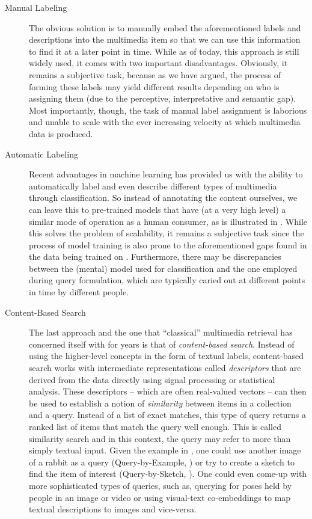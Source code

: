\begin{description}
    \item[Manual Labeling] The obvious solution is to manually embed the aforementioned labels and descriptions into the multimedia item so that we can use this information to find it at a later point in time. While as of today, this approach is still widely used, it comes with two important disadvantages. Obviously, it remains a subjective task, because as we have argued, the process of forming these labels may yield different results depending on who is assigning them (due to the perceptive, interpretative and semantic gap). Most importantly, though, the task of manual label assignment is laborious and unable to scale with the ever increasing velocity at which multimedia data is produced.
    \item[Automatic Labeling] Recent advantages in machine learning has provided us with the ability to automatically label and even describe different types of multimedia through classification. So instead of annotating the content ourselves, we can leave this to pre-trained models that have (at a very high level) a similar mode of operation as a human consumer, as is illustrated in . While this solves the problem of scalability, it remains a subjective task since the process of model training is also prone to the aforementioned gaps found in the data being trained on \cite{Baer2017:Controlling}. Furthermore, there may be discrepancies between the (mental) model used for classification and the one employed during query formulation, which are typically caried out at different points in time by different people.
    \item[Content-Based Search] The last approach and the one that ``classical'' multimedia retrieval has concerned itself with for years is that of \emph{content-based search}. Instead of using the higher-level concepts in the form of textual labels, content-based search works with intermediate representations called \emph{descriptors} that are derived from the data directly using signal processing or statistical analysis. These descriptors -- which are often real-valued vectors \cite{Zezula:2006Similarity} -- can then be used to establish a notion of \emph{similarity} between items in a collection and a query. Instead of a list of exact matches, this type of query returns a ranked list of items that match the query well enough. This is called similarity search \cite{Blanken:2007multimedia} and in this context, the query may refer to more than simply textual input. Given the example in , one could use another image of a rabbit as a query (Query-by-Example, \cite{Kelly:1995Query}) or try to create a sketch to find the item of interest (Query-by-Sketch, \cite{Sciascio:1999Content}). One could even come-up with more sophisticated types of queries, such as, querying for poses held by people in an image or video \cite{Heller:2022Multi} or using visual-text co-embeddings \cite{Spiess:2022Multi} to map textual descriptions to images and vice-versa.
\end{description}

